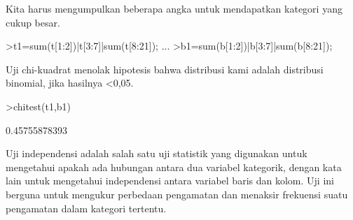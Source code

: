 \documentclass[a4paper,10pt]{article}
\begin{document}
\begin{eulernotebook}
\begin{eulercomment}
\begin{eulercomment}
\begin{eulercomment}
\begin{eulercomment}
\begin{eulercomment}
\begin{eulercomment}
\begin{eulercomment}
\begin{eulercomment}
\begin{eulercomment}
\begin{eulercomment}
\begin{eulercomment}
\begin{eulercomment}
\begin{eulercomment}
\begin{eulercomment}
\begin{eulercomment}
\begin{eulercomment}
\begin{eulercomment}
\begin{eulercomment}
\begin{eulercomment}
Kita harus mengumpulkan beberapa angka untuk mendapatkan kategori yang
cukup besar.
\end{eulercomment}
\begin{eulerprompt}
>t1=sum(t[1:2])|t[3:7]|sum(t[8:21]); ...
>b1=sum(b[1:2])|b[3:7]|sum(b[8:21]);
\end{eulerprompt}
\begin{eulercomment}
Uji chi-kuadrat menolak hipotesis bahwa distribusi kami adalah
distribusi binomial, jika hasilnya \textless{}0,05.
\end{eulercomment}
\begin{eulerprompt}
>chitest(t1,b1)
\end{eulerprompt}
\begin{euleroutput}
  0.45755878393
\end{euleroutput}
\begin{eulercomment}
Uji independensi adalah salah satu uji statistik yang digunakan untuk
mengetahui apakah ada hubungan antara dua variabel kategorik, dengan
kata lain untuk mengetahui independensi antara variabel baris dan
kolom. Uji ini berguna untuk mengukur perbedaan pengamatan dan
menaksir frekuensi suatu pengamatan dalam kategori tertentu.


\end{eulercomment}
\end{eulercomment}
\end{eulercomment}
\end{eulercomment}
\end{eulercomment}
\end{eulercomment}
\end{eulercomment}
\end{eulercomment}
\end{eulercomment}
\end{eulercomment}
\end{eulercomment}
\end{eulercomment}
\end{eulercomment}
\end{eulercomment}
\end{eulercomment}
\end{eulercomment}
\end{eulercomment}
\end{eulercomment}
\end{eulercomment}
\end{eulernotebook}
\end{document}

